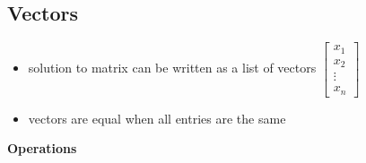 \documentclass[a4paper,12pt]{article}
\theoremstyle{definition}
\theoremstyle{definition}
\begin{document}
	\subsection{Vectors}
	\begin{itemize}
		\item solution to matrix can be written as a list of vectors
		$\begin{bmatrix}
			x_1\\
			x_2\\
			\vdots\\
			x_n
		\end{bmatrix}$
	
		\item vectors are equal when all entries are the same
	\end{itemize}

	\textbf{Operations}
\end{document}
